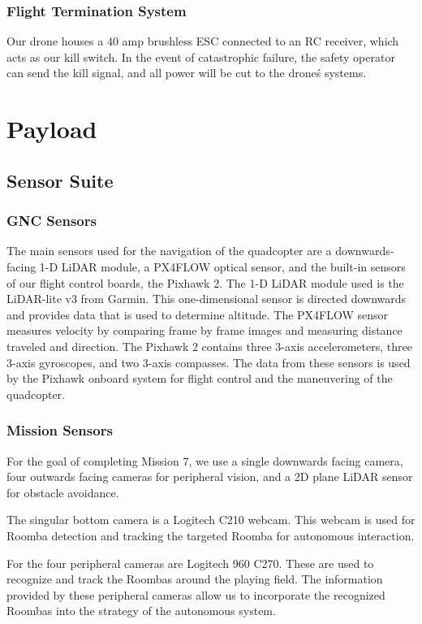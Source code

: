 \documentclass[12pt,letterpaper]{article}
\begin{document}
		\subsubsection*{Flight Termination System}
			Our drone houses a 40 amp brushless ESC connected to an RC receiver, which acts as our kill switch. In the event of catastrophic failure, the safety operator can send the kill signal, and all power will be cut to the drone\'s systems.

\section*{Payload}
	\subsection*{Sensor Suite}
		\subsubsection*{GNC Sensors}
			The main sensors used for the navigation of the quadcopter are a downwards-facing 1-D LiDAR module, a PX4FLOW optical sensor, and the built-in sensors of our flight control boards, the Pixhawk 2.
			The 1-D LiDAR module used is the LiDAR-lite v3 from Garmin. This one-dimensional sensor is directed downwards and provides data that is used to determine altitude. The PX4FLOW sensor measures velocity by comparing frame by frame images and measuring distance traveled and direction.
			The Pixhawk 2 contains three 3-axis accelerometers, three 3-axis gyroscopes, and two 3-axis compasses. The data from these sensors is used by the Pixhawk onboard system for flight control and the maneuvering of the quadcopter.
		\subsubsection*{Mission Sensors}
			For the goal of completing Mission 7, we use a single downwards facing camera, four outwards facing cameras for peripheral vision, and a 2D plane LiDAR sensor for obstacle avoidance.

			The singular bottom camera is a Logitech C210 webcam. This webcam is used for Roomba detection and tracking the targeted Roomba for autonomous interaction.

			For the four peripheral cameras are Logitech 960 C270. These are used to recognize and track the Roombas around the playing field. The information provided by these peripheral cameras allow us to incorporate the recognized Roombas into the strategy of the autonomous system.
\end{document}
